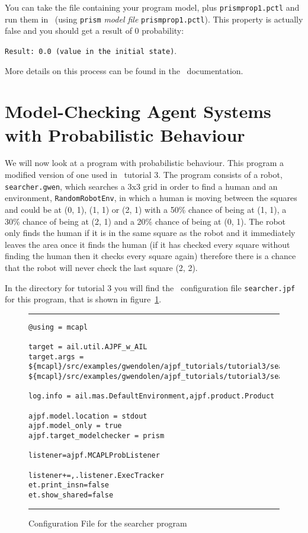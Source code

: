 \documentclass[a4]{article}
\begin{document}
You can take the file containing  your program model, plus \texttt{prismprop1.pctl} and run them in \prism\ (using \texttt{prism} \emph{model file} \texttt{prismprop1.pctl}).  This property is actually false and you should get a result of 0 probability:

\texttt{Result: 0.0 (value in the initial state)}.

More details on this process can be found in the \spin\ documentation.

\section{Model-Checking Agent Systems with Probabilistic Behaviour}

We will now look at a program with probabilistic behaviour.  This program a modified version of one used in \ail\ tutorial 3. The program consists of a robot, \texttt{searcher.gwen}, which searches a 3x3 grid in order to find a human and an environment, \texttt{RandomRobotEnv}, in which a human is moving between the squares and could be at (0, 1), (1, 1) or (2, 1) with a 50\% chance of being at (1, 1), a 30\% chance of being at (2, 1) and a 20\% chance of being at (0, 1).  The robot only finds the human if it is in the same square as the robot and it immediately leaves the area once it finds the human (if it has checked every square without finding the human then it checks every square again) therefore there is a chance that the robot will never check the last square (2, 2).

In the directory for tutorial 3 you will find the \ajpf\ configuration file \texttt{searcher.jpf} for this program, that is shown in figure~\ref{fig:prism_config2}.

\begin{figure}
\noindent\rule{\textwidth}{1pt}
\begin{small}
\begin{verbatim}
@using = mcapl

target = ail.util.AJPF_w_AIL
target.args = ${mcapl}/src/examples/gwendolen/ajpf_tutorials/tutorial3/searcher.ail,
${mcapl}/src/examples/gwendolen/ajpf_tutorials/tutorial3/searcher.psl,1

log.info = ail.mas.DefaultEnvironment,ajpf.product.Product

ajpf.model.location = stdout
ajpf.model_only = true
ajpf.target_modelchecker = prism

listener=ajpf.MCAPLProbListener

listener+=,.listener.ExecTracker
et.print_insn=false
et.show_shared=false
\end{verbatim}
\end{small}
\noindent\rule{\textwidth}{1pt}
\caption{Configuration File for the searcher program}
\label{fig:prism_config2}
\end{figure}
\end{document}
